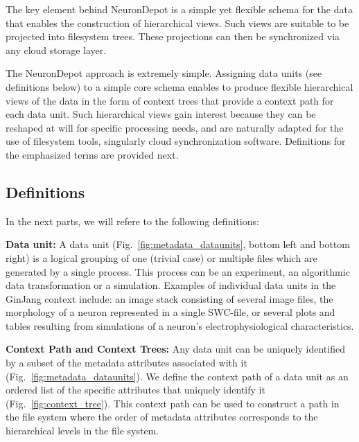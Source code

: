 \documentclass{frontiersSCNS} %
\begin{document}
The key element behind NeuronDepot is a simple yet flexible schema for the data
that enables the construction of  hierarchical views. Such views are suitable
to be projected into filesystem trees. These projections can then be
synchronized via any cloud storage layer. 

The NeuronDepot approach is extremely simple. Assigning data units (see
definitions below) to a simple core schema enables to produce flexible
hierarchical views of the data in the form of context trees that provide a
context path for each data unit. Such hierarchical views gain interest because
they can be reshaped at will for specific processing needs, and are naturally
adapted for the use of filesystem tools, singularly cloud synchronization
software. Definitions for the emphasized terms are provided next.


\subsection{Definitions}

In the next parts, we will refere to the following definitions:

\textbf{Data unit:} A data unit (Fig.~\ref{fig:metadata_dataunits}, bottom
left and bottom right) is a logical grouping of one (trivial case) or multiple
files which are generated by a single process. This process can be an
experiment, an algorithmic data transformation or a simulation. Examples of
individual data units in the GinJang context include: an image stack consisting
of several image files, the morphology of a neuron represented in a single
SWC-file, or several plots and tables resulting from simulations of a neuron's
electrophysiological characteristics.

\textbf{Context Path and Context Trees:} Any data unit can be uniquely
identified by a subset of the metadata attributes associated with it
(Fig.~\ref{fig:metadata_dataunits}). We define the context path of a data unit
as an ordered list of the specific attributes that uniquely identify it
(Fig.~\ref{fig:context_tree}). This context path can be used to construct a
path in the file system where the order of metadata attributes corresponds to
the hierarchical levels in the file system. 
\end{document}
